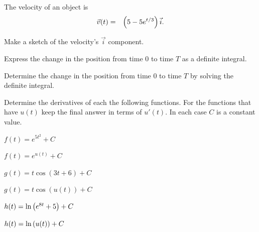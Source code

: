 \begin{problem}
\item The velocity of an object is
  \begin{eqnarray*}
    \vec{v}(t) & = & \left( 5 - 5 e^{t/3} \right) \vec{i}.
  \end{eqnarray*}
  \begin{subproblem}
  \item Make a sketch of the velocity's $\vec{i}$ component.
    \vfill
  \item Express the change in the position from time 0 to time $T$ as
    a definite integral.
    \vfill
  \item Determine the change in the position from time 0 to time $T$
    by solving the definite integral.
    \vfill
  \end{subproblem}
\end{problem}



\begin{problem}
\item Determine the derivatives of each the following functions. For
  the functions that have $u(t)$ keep the final answer in terms of
  $u'(t)$. In each case $C$ is a constant value.
  \begin{subproblem}
    \item $f(t) = e^{5t^2} + C$
      \vfill
    \item $f(t) = e^{u(t)} + C$
      \vfill
    \item $g(t) = t \cos(3t+6)  + C$
      \vfill
    \item $g(t) = t \cos(u(t))  + C$
      \vfill
    \item $h(t) = \ln\left( e^{8t} + 5 \right)  + C$
      \vfill
    \item $h(t) = \ln\left( u(t) \right)  + C$
      \vfill
  \end{subproblem}

\end{problem}


